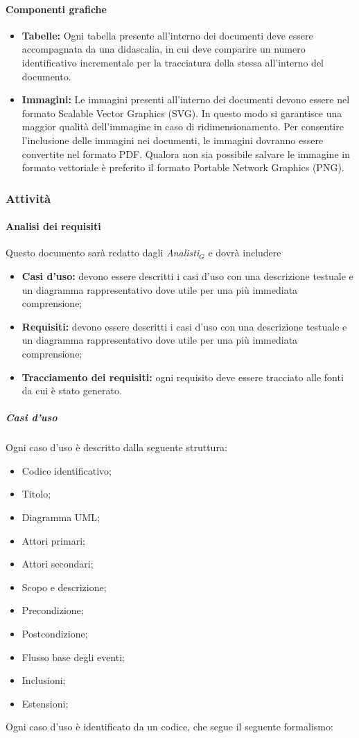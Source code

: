 \paragraph{Componenti grafiche}
	\begin{itemize}
	\item \textbf{Tabelle:} 
	Ogni tabella presente all'interno dei documenti deve essere accompagnata da una didascalia,	in cui deve comparire un numero identificativo incrementale per la tracciatura della stessa all'interno del documento.
	\item \textbf{Immagini:}
	Le immagini presenti all'interno dei documenti devono essere nel formato Scalable Vector Graphics (SVG). In questo modo si garantisce una maggior qualità dell'immagine in caso di ridimensionamento. Per consentire l’inclusione delle immagini nei documenti,
	le immagini dovranno essere convertite nel formato PDF. Qualora non sia possibile
	salvare le immagine in formato vettoriale è preferito il formato Portable Network
	Graphics (PNG).

	\end{itemize}
\subsubsection{Attività}
\paragraph{Analisi dei requisiti}
Questo documento sarà redatto dagli \textit{Analisti$_{G}$} e dovrà includere
\begin{itemize}
	\item{\textbf{Casi d'uso:}}  devono essere descritti i casi d’uso con una descrizione testuale e
	un diagramma rappresentativo dove utile per una più immediata comprensione;
	\item{\textbf{Requisiti:}}  devono essere descritti i casi d’uso con una descrizione testuale e
	un diagramma rappresentativo dove utile per una più immediata comprensione;
	\item{\textbf{Tracciamento dei requisiti:}}  ogni requisito deve essere tracciato alle fonti da cui è stato generato.
\end{itemize}
\subparagraph {Casi d'uso}
Ogni caso d'uso è descritto dalla seguente struttura:
\begin{itemize}
\item Codice identificativo;
\item Titolo;
\item Diagramma UML;
\item Attori primari;
\item Attori secondari;
\item Scopo e descrizione;
\item Precondizione;
\item Postcondizione;
\item Flusso base degli eventi;
\item Inclusioni;
\item Estensioni;
\end{itemize}
Ogni caso d’uso è identificato da un codice, che segue il seguente formalismo: \\

